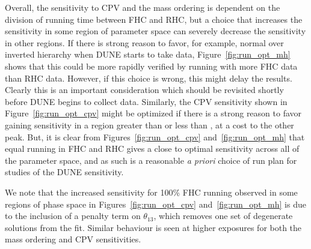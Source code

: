 Overall, the sensitivity to CPV and the mass ordering is dependent on the division of running time between FHC and RHC, but a choice that increases the sensitivity in some region of parameter space can severely decrease the sensitivity in other regions. If there is strong reason to favor, for example, normal over inverted hierarchy when DUNE starts to take data, Figure~\ref{fig:run_opt_mh} shows that this could be more rapidly verified by running with more FHC data than RHC data. However, if this choice is wrong, this might delay the results. Clearly this is an important consideration which should be revisited shortly before DUNE begins to collect data. Similarly, the CPV sensitivity shown in Figure~\ref{fig:run_opt_cpv} might be optimized if there is a strong reason to favor gaining sensitivity in a region greater than or less than \deltacp, at a cost to the other peak. But, it is clear from Figures~\ref{fig:run_opt_cpv} and~\ref{fig:run_opt_mh} that equal running in FHC and RHC gives a close to optimal sensitivity across all of the parameter space, and as such is a reasonable {\it a priori} choice of run plan for studies of the DUNE sensitivity.

We note that the increased sensitivity for 100\% FHC running observed in some regions of phase space in Figures~\ref{fig:run_opt_cpv} and~\ref{fig:run_opt_mh} is due to the inclusion of a penalty term on $\theta_{13}$, which removes one set of degenerate solutions from the fit. Similar behaviour is seen at higher exposures for both the mass ordering and CPV sensitivities.
